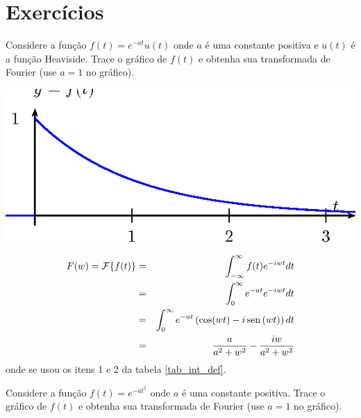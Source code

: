 \section{Exercícios}
\begin{Exercise}{\label{transf_exp_heav}} Considere a função $f(t)=e^{-at}u(t)$ onde $a$ é uma constante positiva e $u(t)$ é a função Heaviside. Trace o gráfico de $f(t)$ e obtenha sua transformada de Fourier  (use $a=1$ no gráfico).
\end{Exercise}
\begin{Answer}
\begin{center}
\includegraphics{cap_transformada_de_fourier/pics/figura_8}\end{center}
\begin{eqnarray*}
F(w)=\mathcal{F}\{f(t)\}&=&\int_{-\infty}^\infty f(t) e^{-i w t}dt\\
&=&\int_{0}^\infty e^{-at} e^{-i w t}dt\\
&=&\int_{0}^\infty e^{-at} \left(\cos(wt)-i\operatorname{sen}\,(wt)\right)dt\\
&=&\frac{a}{a^2+w^2}-\frac{iw}{a^2+w^2}\\
\end{eqnarray*}
onde se usou os itens 1 e 2 da tabela \ref{tab_int_def}.
\end{Answer}
\begin{Exercise}{\label{Exer_trans_exp_t2}} Considere a função $f(t)=e^{-at^2}$ onde $a$ é uma constante positiva. Trace o gráfico de $f(t)$ e obtenha sua transformada de Fourier (use $a=1$ no gráfico).
\end{Exercise}

